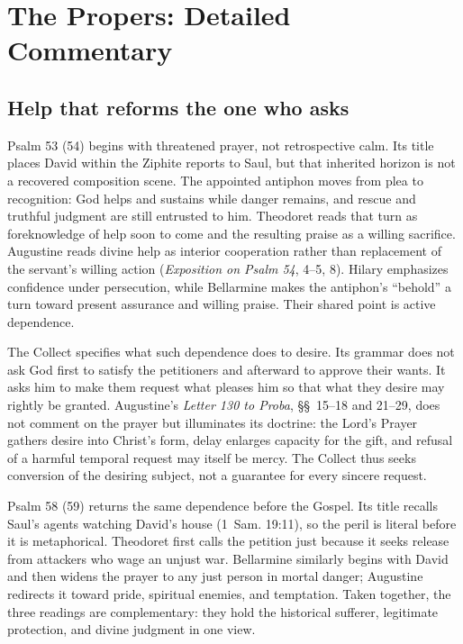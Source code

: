 \section*{The Propers: Detailed Commentary}

\subsection*{Help that reforms the one who asks\enspace{}}

Psalm 53 (54) begins with threatened prayer, not retrospective calm. Its title places David within the Ziphite reports to Saul, but that inherited horizon is not a recovered composition scene. The appointed antiphon moves from plea to recognition: God helps and sustains while danger remains, and rescue and truthful judgment are still entrusted to him. Theodoret reads that turn as foreknowledge of help soon to come and the resulting praise as a willing sacrifice. Augustine reads divine help as interior cooperation rather than replacement of the servant's willing action (\emph{Exposition on Psalm 54}, 4--5, 8). Hilary emphasizes confidence under persecution, while Bellarmine makes the antiphon's ``behold'' a turn toward present assurance and willing praise. Their shared point is active dependence.

The Collect specifies what such dependence does to desire. Its grammar does not ask God first to satisfy the petitioners and afterward to approve their wants. It asks him to make them request what pleases him so that what they desire may rightly be granted. Augustine's \emph{Letter 130 to Proba}, \S\S~15--18 and 21--29, does not comment on the prayer but illuminates its doctrine: the Lord's Prayer gathers desire into Christ's form, delay enlarges capacity for the gift, and refusal of a harmful temporal request may itself be mercy. The Collect thus seeks conversion of the desiring subject, not a guarantee for every sincere request.

Psalm 58 (59) returns the same dependence before the Gospel. Its title recalls Saul's agents watching David's house (1~Sam. 19:11), so the peril is literal before it is metaphorical. Theodoret first calls the petition just because it seeks release from attackers who wage an unjust war. Bellarmine similarly begins with David and then widens the prayer to any just person in mortal danger; Augustine redirects it toward pride, spiritual enemies, and temptation. Taken together, the three readings are complementary: they hold the historical sufferer, legitimate protection, and divine judgment in one view.

